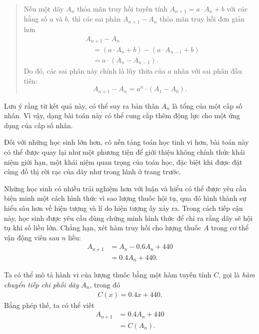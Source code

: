 {\begin{description}
      \begin{quotation}
        Nếu một dãy $A_n$ thỏa mãn truy hồi tuyến tính $A_{n+1}=a\cdot A_n+b$ với các hằng số $a$ và $b$, thì các sai phân $A_{n+1}-A_n$ thỏa mãn truy hồi đơn giản hơn
        \begin{align*}
          &A_{n+1}-A_n \\
          &\quad =(a\cdot A_n+b)-(a\cdot A_{n-1}+b) \\
          &\quad =a\cdot (A_n-A_{n-1}).
        \end{align*}
        Do đó, các sai phân này chính là lũy thừa của $a$ nhân với sai phân đầu tiên:
        $$
        A_{n+1}-A_n
          =a^n\cdot (A_1-A_0).
        $$
      \end{quotation}

      Lưu ý rằng từ kết quả này, có thể suy ra bản thân $A_n$ là tổng của một cấp số nhân. Vì vậy, dạng bài toán này có thể cung cấp thêm động lực cho một ứng dụng của cấp số nhân.

      \item[Phương pháp 4.] Đối với những học sinh lớn hơn, có nền tảng toán học tinh vi hơn, bài toán này có thể được quay lại như một phương tiện để giới thiệu không chính thức khái niệm giới hạn, một khái niệm quan trọng của toán học, đặc biệt khi được đặt cùng đồ thị rời rạc của dãy như trong hình ở trang trước.
      
      \item[Phương pháp 5.] Những học sinh có nhiều trải nghiệm hơn với luận và hiểu có thể được yêu cầu biện minh một cách hình thức vì sao lượng thuốc hội tụ, qua đó hình thành sự hiểu sâu hơn về hiện tượng và lí do hiện tượng ấy xảy ra. Trong cách tiếp cận này, học sinh được yêu cầu dùng chứng minh hình thức để chỉ ra rằng dãy sẽ hội tụ khi số liều lớn. Chẳng hạn, xét hàm truy hồi cho lượng thuốc $A$ trong cơ thể vận động viên sau $n$ liều:\vspace{2\baselineskip}
      \begin{align*}
        A_{n+1}
          &=A_n-0.6A_n+440 \\
          &=0.4A_n+440. \tag{1}
      \end{align*} 

      Ta có thể mô tả hành vi của lượng thuốc bằng một hàm tuyến tính $C$, gọi là \emph{hàm chuyển tiếp chi phối dãy} $A_n$, trong đó\vspace{\baselineskip}
        \begin{align*}
          C(x)=0.4x+440. \tag{2}
        \end{align*} 
      Bằng phép thế, ta có thể viết
      \begin{align*}
        A_{n+1}
          &=0.4A_n+440 \\
          &=C(A_n). \tag{3}
      \end{align*} 


\end{description}}
